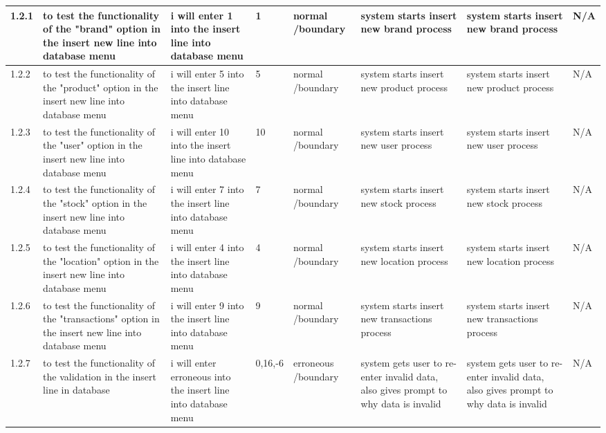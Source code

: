 \begin{landscape}
\begin{center}
\begin{longtable}{|p{1.5cm}|p{2.5cm}|p{2.5cm}|p{2cm}|p{2cm}|p{2cm}|p{2cm}|p{2cm}|}
1.2.1 & to test the functionality of the "brand" option in the insert new line into database menu & i will enter 1 into the insert line into database menu  & 1 & normal /boundary & system starts insert new brand process & system starts insert new brand process & N/A \\ \hline
1.2.2 & to test the functionality of the "product" option in the insert new line into database menu & i will enter 5 into the insert line into database menu & 5 & normal /boundary & system starts insert new product process & system starts insert new product process & N/A \\ \hline
1.2.3 & to test the functionality of the "user" option in the insert new line into database menu & i will enter 10 into the insert line into database menu & 10 & normal /boundary & system starts insert new user process & system starts insert new user process & N/A \\ \hline
1.2.4 & to test the functionality of the "stock" option in the insert new line into database menu & i will enter 7 into the insert line into database menu & 7 & normal /boundary & system starts insert new stock process & system starts insert new stock process & N/A \\ \hline
1.2.5 & to test the functionality of the "location" option in the insert new line into database menu & i will enter 4 into the insert line into database menu & 4 & normal /boundary & system starts insert new location process & system starts insert new location process & N/A \\ \hline
1.2.6 & to test the functionality of the "transactions" option in the insert new line into database menu & i will enter 9 into the insert line into database menu & 9 & normal /boundary & system starts insert new transactions process & system starts insert new transactions process & N/A \\ \hline
1.2.7 & to test the functionality of the validation in the insert line in database & i will enter erroneous into the insert line into database menu & 0,16,-6 & erroneous /boundary & system gets user to re-enter invalid data, also gives prompt to why data is invalid & system gets user to re-enter invalid data, also gives prompt to why data is invalid & N/A \\ \hline


\end{longtable}
\end{center}
\end{landscape}
